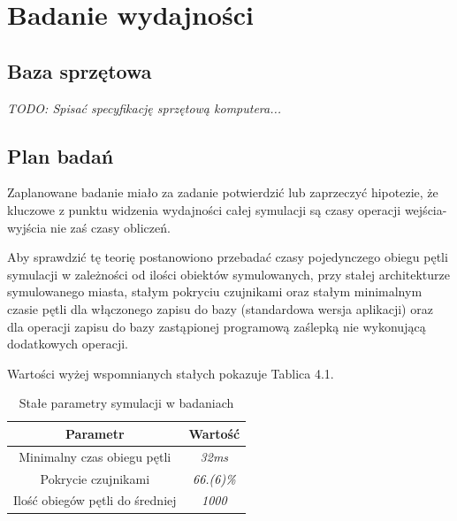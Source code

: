 \chapter{Badanie wydajności}
\section{Baza sprzętowa}
\par{
\textit{
TODO: Spisać specyfikację sprzętową komputera...
}
}

\section{Plan badań}
\par{
Zaplanowane badanie miało za zadanie potwierdzić lub zaprzeczyć hipotezie, że kluczowe z punktu widzenia wydajności całej symulacji są czasy operacji wejścia-wyjścia nie zaś czasy obliczeń.
}
\par{
Aby sprawdzić tę teorię postanowiono przebadać czasy pojedynczego obiegu pętli symulacji w zależności od ilości obiektów symulowanych, przy stałej architekturze symulowanego miasta, stałym pokryciu czujnikami oraz stałym minimalnym czasie pętli dla włączonego zapisu do bazy (standardowa wersja aplikacji) oraz dla operacji zapisu do bazy zastąpionej programową zaślepką nie wykonującą dodatkowych operacji.
}
\par{
Wartości wyżej wspomnianych stałych pokazuje Tablica 4.1.
}
\par{
\begin{table}[t]
\caption{Stałe parametry symulacji w badaniach}
\label{Tabela 1}
\begin{center}
\begin{tabular}{|c|c|}
  \hline 
  \textbf{Parametr} & \textbf{Wartość} \\
  \hline
  Minimalny czas obiegu pętli & \textit{32ms} \\
  Pokrycie czujnikami & \textit{66.(6)\%} \\
  Ilość obiegów pętli do średniej & \textit{1000} \\
  \hline  
\end{tabular}
\end{center}
\end{table}
}

